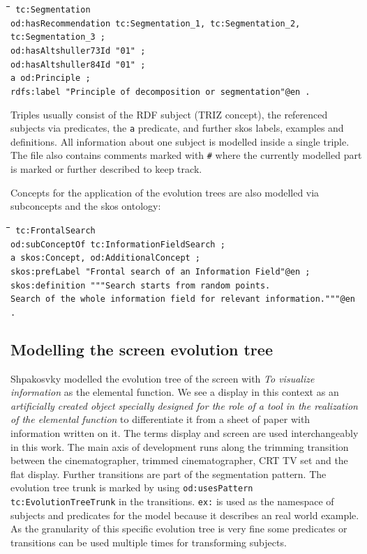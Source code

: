 \documentclass[11pt,a4paper]{article}
\newenvironment{code}{\tt \begin{tabbing}
\hskip12pt\=\hskip12pt\=\hskip12pt\=\hskip12pt\=\hskip5cm\=\hskip5cm\=\kill}
{\end{tabbing}}
\begin{document}
\begin{code}\tt
tc:Segmentation \\
\> od:hasRecommendation tc:Segmentation\_1, tc:Segmentation\_2, tc:Segmentation\_3 ; \\
\> od:hasAltshuller73Id "01" ; \\
\> od:hasAltshuller84Id "01" ; \\
\> a od:Principle ; \\
\> rdfs:label "Principle of decomposition or segmentation"@en .
\end{code}

Triples usually consist of the RDF subject (TRIZ concept), the referenced subjects via predicates, the \texttt{a} predicate, and further skos labels, examples and definitions. All information about one subject is modelled inside a single triple. The file also contains comments marked with \texttt{\#} where the currently modelled part is marked or further described to keep track.

Concepts for the application of the evolution trees are also modelled via subconcepts and the skos ontology:
\begin{code}\tt
tc:FrontalSearch \\
\> od:subConceptOf tc:InformationFieldSearch ; \\
\> a skos:Concept, od:AdditionalConcept ; \\
\> skos:prefLabel "Frontal search of an Information Field"@en ; \\
\> skos:definition """Search starts from random points. \\
\>\> Search of the whole information field for relevant information."""@en .
\end{code}


\subsection{Modelling the screen evolution tree}

Shpakosvky modelled the evolution tree of the screen with \textit{To visualize information} as the elemental function. We see a display in this context as an \textit{artificially created object specially designed for the role of a tool in the realization of the elemental function}\cite{Shpakovsky2016} to differentiate it from a sheet of paper with information written on it. The terms display and screen are used interchangeably in this work. The main axis of development runs along the trimming transition between the cinematographer, trimmed cinematographer, CRT TV set and the flat display. Further transitions are part of the segmentation pattern. The evolution tree trunk is marked by using \texttt{od:usesPattern tc:EvolutionTreeTrunk} in the transitions. \texttt{ex:} is used as the namespace of subjects and predicates for the model because it describes an real world example. As the granularity of this specific evolution tree is very fine some predicates or transitions can be used multiple times for transforming subjects. 
\end{document}

